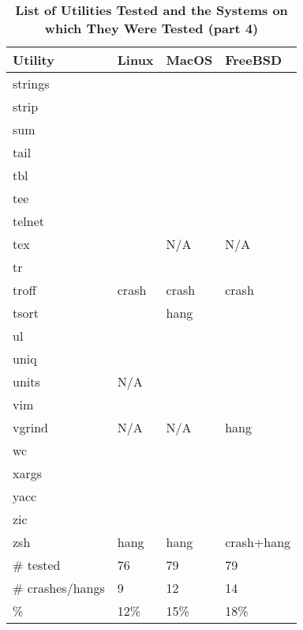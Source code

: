 \begin{table}[htbp]  %
\renewcommand\thetable{1}
\centering  %
 \begin{tabular}{|p{2.5cm}|p{2cm}|p{2cm}|p{2cm}|} 
     \hline
     \hline
        Utility & Linux & MacOS & FreeBSD \\  %
       \hline
       strings &   &   &    \\
       strip &   &   &    \\
       sum &   &   &    \\
       tail &   &   &    \\
       tbl &   &   &    \\
       tee &   &   &    \\
       telnet &   &   &    \\
       tex &   & N/A  & N/A   \\
       tr &   &   &    \\
       troff & crash  & crash  & crash   \\
       tsort &   & hang  &    \\
       ul &   &   &    \\
       uniq &   &   &    \\
       units & N/A  &   &    \\
       vim &   &   &    \\
       vgrind & N/A  & N/A  &  hang  \\
       wc &   &   &    \\
       xargs &   &   &    \\
       yacc &   &   &    \\
       zic &   &   &    \\
       zsh & hang  & hang  & crash+hang   \\
       \hline
       \# tested & 76  & 79  &  79  \\
       \# crashes/hangs & 9  & 12  &  14  \\
       \% & 12\%  & 15\%  & 18\%   \\ 
       \hline
       \hline
   \end{tabular}
   \caption{\textbf{List of Utilities Tested and the Systems on which They Were Tested (part 4)}}  %
\end{table}


